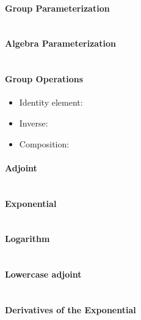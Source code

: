 \begin{properties}[breakable, title={$\SEtwo$ parameterized by $\Uone \times \mathbb{R}^{2}$}]
\paragraph{Group Parameterization}
\begin{equation}
\end{equation}

\paragraph{Algebra Parameterization}
\begin{equation}
\end{equation}

\paragraph{Group Operations}
\begin{itemize}
  \item Identity element:
  \item Inverse:
  \item Composition:
\end{itemize}

\paragraph{Adjoint}
\begin{equation}
\end{equation}

\paragraph{Exponential}
\begin{equation}
\end{equation}

\paragraph{Logarithm}
\begin{equation}
\end{equation}

\paragraph{Lowercase adjoint}
\begin{equation}
\end{equation}

\paragraph{Derivatives of the Exponential}
\begin{equation}
\end{equation}
\end{properties}


